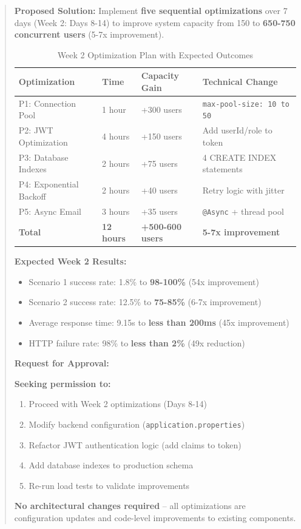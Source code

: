 \documentclass[12pt,a4paper,oneside]{report}
\begin{document}
\begin{abstract}
\noindent\textbf{Proposed Solution:} Implement \textbf{five sequential optimizations} over 7 days (Week 2: Days 8-14) to improve system capacity from 150 to \textbf{650-750 concurrent users} (5-7x improvement).

\begin{table}[H]
\centering
\small
\begin{tabular}{@{}llll@{}}
\toprule
\textbf{Optimization} & \textbf{Time} & \textbf{Capacity Gain} & \textbf{Technical Change} \\
\midrule
P1: Connection Pool & 1 hour & +300 users & \texttt{max-pool-size: 10 to 50} \\
P2: JWT Optimization & 4 hours & +150 users & Add userId/role to token \\
P3: Database Indexes & 2 hours & +75 users & 4 CREATE INDEX statements \\
P4: Exponential Backoff & 2 hours & +40 users & Retry logic with jitter \\
P5: Async Email & 3 hours & +35 users & \texttt{@Async} + thread pool \\
\midrule
\textbf{Total} & \textbf{12 hours} & \textbf{+500-600 users} & \textbf{5-7x improvement} \\
\bottomrule
\end{tabular}
\caption{Week 2 Optimization Plan with Expected Outcomes}
\end{table}

\noindent\textbf{Expected Week 2 Results:}
\begin{itemize}[leftmargin=1.5em,topsep=0.3em,itemsep=0.2em]
    \item Scenario 1 success rate: 1.8\% to \textbf{98-100\%} (54x improvement)
    \item Scenario 2 success rate: 12.5\% to \textbf{75-85\%} (6-7x improvement)
    \item Average response time: 9.15s to \textbf{less than 200ms} (45x improvement)
    \item HTTP failure rate: 98\% to \textbf{less than 2\%} (49x reduction)
\end{itemize}

\noindent\textbf{Request for Approval:}

\textbf{Seeking permission to:}
\begin{enumerate}[leftmargin=1.5em,topsep=0.3em,itemsep=0.2em]
    \item Proceed with Week 2 optimizations (Days 8-14)
    \item Modify backend configuration (\texttt{application.properties})
    \item Refactor JWT authentication logic (add claims to token)
    \item Add database indexes to production schema
    \item Re-run load tests to validate improvements
\end{enumerate}

\textbf{No architectural changes required} -- all optimizations are configuration updates and code-level improvements to existing components.

\end{abstract}
\end{document}

